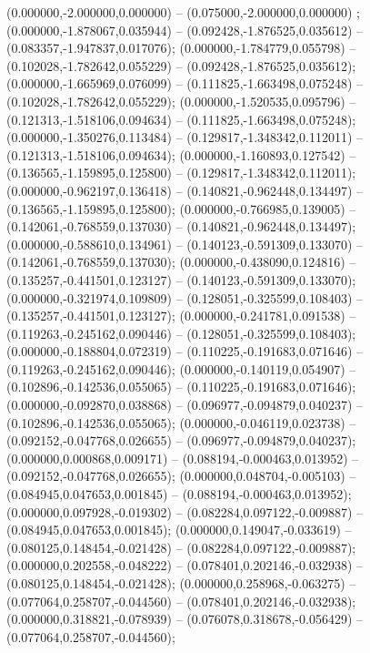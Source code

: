  (0.000000,-2.000000,0.000000) -- (0.075000,-2.000000,0.000000) ;
 (0.000000,-1.878067,0.035944) -- (0.092428,-1.876525,0.035612) -- (0.083357,-1.947837,0.017076);
 (0.000000,-1.784779,0.055798) -- (0.102028,-1.782642,0.055229) -- (0.092428,-1.876525,0.035612);
 (0.000000,-1.665969,0.076099) -- (0.111825,-1.663498,0.075248) -- (0.102028,-1.782642,0.055229);
 (0.000000,-1.520535,0.095796) -- (0.121313,-1.518106,0.094634) -- (0.111825,-1.663498,0.075248);
 (0.000000,-1.350276,0.113484) -- (0.129817,-1.348342,0.112011) -- (0.121313,-1.518106,0.094634);
 (0.000000,-1.160893,0.127542) -- (0.136565,-1.159895,0.125800) -- (0.129817,-1.348342,0.112011);
 (0.000000,-0.962197,0.136418) -- (0.140821,-0.962448,0.134497) -- (0.136565,-1.159895,0.125800);
 (0.000000,-0.766985,0.139005) -- (0.142061,-0.768559,0.137030) -- (0.140821,-0.962448,0.134497);
 (0.000000,-0.588610,0.134961) -- (0.140123,-0.591309,0.133070) -- (0.142061,-0.768559,0.137030);
 (0.000000,-0.438090,0.124816) -- (0.135257,-0.441501,0.123127) -- (0.140123,-0.591309,0.133070);
 (0.000000,-0.321974,0.109809) -- (0.128051,-0.325599,0.108403) -- (0.135257,-0.441501,0.123127);
 (0.000000,-0.241781,0.091538) -- (0.119263,-0.245162,0.090446) -- (0.128051,-0.325599,0.108403);
 (0.000000,-0.188804,0.072319) -- (0.110225,-0.191683,0.071646) -- (0.119263,-0.245162,0.090446);
 (0.000000,-0.140119,0.054907) -- (0.102896,-0.142536,0.055065) -- (0.110225,-0.191683,0.071646);
 (0.000000,-0.092870,0.038868) -- (0.096977,-0.094879,0.040237) -- (0.102896,-0.142536,0.055065);
 (0.000000,-0.046119,0.023738) -- (0.092152,-0.047768,0.026655) -- (0.096977,-0.094879,0.040237);
 (0.000000,0.000868,0.009171) -- (0.088194,-0.000463,0.013952) -- (0.092152,-0.047768,0.026655);
 (0.000000,0.048704,-0.005103) -- (0.084945,0.047653,0.001845) -- (0.088194,-0.000463,0.013952);
 (0.000000,0.097928,-0.019302) -- (0.082284,0.097122,-0.009887) -- (0.084945,0.047653,0.001845);
 (0.000000,0.149047,-0.033619) -- (0.080125,0.148454,-0.021428) -- (0.082284,0.097122,-0.009887);
 (0.000000,0.202558,-0.048222) -- (0.078401,0.202146,-0.032938) -- (0.080125,0.148454,-0.021428);
 (0.000000,0.258968,-0.063275) -- (0.077064,0.258707,-0.044560) -- (0.078401,0.202146,-0.032938);
 (0.000000,0.318821,-0.078939) -- (0.076078,0.318678,-0.056429) -- (0.077064,0.258707,-0.044560);

